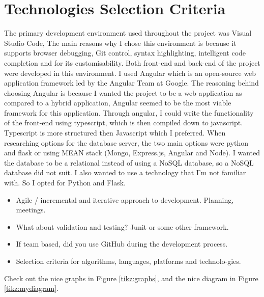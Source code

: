 \section{Technologies Selection Criteria}
The primary development environment used throughout the project was Visual Studio Code, The main reasons why I chose this environment is because it supports browser debugging, Git control, syntax highlighting, intelligent code completion and for its customisability. Both front-end and back-end of the project were developed in this environment.
I used Angular which is an open-source web application framework led by the Angular Team at Google. The reasoning behind choosing Angular is because I wanted the project to be a web application as compared to a hybrid application, Angular seemed to be the most viable framework for this application. Through angular, I could write the functionality of the front-end using typescript, which is then compiled down to javascript. Typescript is more structured then Javascript which I preferred.
When researching options for the database server, the two main options were python and flask or using MEAN stack (Mongo, Express.js, Angular and Node). I wanted the database to be a relational instead of using a NoSQL database, so a NoSQL database did not suit. I also wanted to use a technology that I'm not familiar with. So I opted for Python and Flask.
\par
\begin{itemize}
	\item Agile / incremental and iterative approach to development. Planning, meetings.
	\item What about validation and testing? Junit or some other framework.
	\item If team based, did you use GitHub during the development process.
	\item Selection criteria for algorithms, languages, platforms and technolo-gies.
\end{itemize}
Check out the nice graphs in Figure \ref{tikz:graphs}, and the nice diagram in Figure \ref{tikz:mydiagram}.

